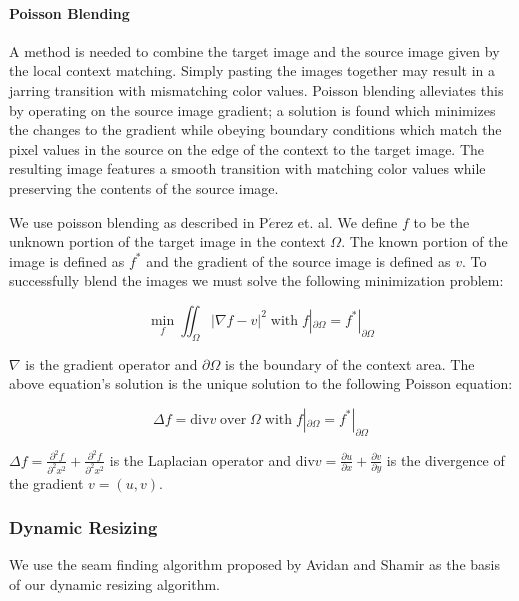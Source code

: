 \documentclass[11pt]{amsart}
\begin{document}
\paragraph{\sc Poisson Blending}



A method is needed to combine the target image and the source image given by the local context matching. Simply pasting the images together may result in a jarring transition with mismatching color values. Poisson blending alleviates this by operating on the source image gradient; a solution is found which minimizes the changes to the gradient while obeying boundary conditions which match the pixel values in the source on the edge of the context to the target image. The resulting image features a smooth transition with matching color values while preserving the contents of the source image.


We use poisson blending as described in P$\acute{e}$rez et. al. \cite{Perez:2003} We define $f$ to be the unknown portion of the target image in the context $\Omega$. The known portion of the image is defined as $f^\ast$ and the gradient of the source image is defined as $v$. To successfully blend the images we must solve the following minimization problem:

$$ 
\min_f \iint_\Omega|\nabla f-v|^{2} \;\mathrm{with}\; f|_{\partial\Omega} = f^{\ast}|_{\partial\Omega} 
$$

$\nabla$ is the gradient operator and $\partial\Omega$ is the boundary of the context area. The above equation's solution is the unique solution to the following Poisson equation:

$$
\Delta f=\mathrm{div} v\;\mathrm{ over }\;\Omega\;\mathrm{  with}\;  f|_{\partial\Omega} = f^{\ast}|_{\partial\Omega}
$$

$\Delta f = \frac{\partial^{2} f}{\partial^{2}x^2}+\frac{\partial^{2}f}{\partial^{2}x^2}$ is the Laplacian operator and $\mathrm{div} v = \frac{\partial u}{\partial x}+\frac{\partial v}{\partial y}$ is the divergence of the gradient $v=(u,v)$.


\subsubsection{Dynamic Resizing}

We use the seam finding algorithm proposed by Avidan and Shamir \cite{Avidan:2007} as the basis of our dynamic resizing algorithm. 
\end{document}

